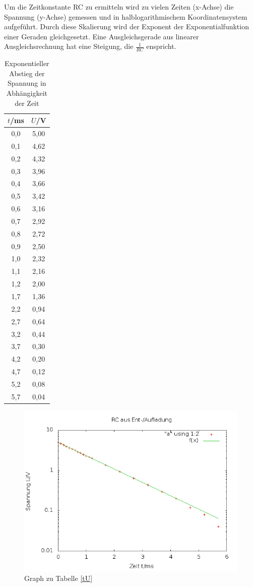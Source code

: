 Um die Zeitkonstante RC zu ermitteln wird zu vielen Zeiten (x-Achse) die Spannung (y-Achse) gemessen und in halblogarithmischem Koordinatensystem
aufgeführt. Durch diese Skalierung wird der Exponent der Exponentialfunktion einer Geraden gleichgesetzt. Eine Ausgleichsgerade aus linearer 
Ausgleichsrechnung hat eine Steigung, die $\frac{1}{RC}$ enspricht. 

\renewcommand{\arraystretch}{0.8}
\begin{table}[h!]
\begin{tabular}{c|c}
$t$/ms & $U$/V\\
\hline
0,0 &	5,00\\
0,1 &	4,62\\
0,2 &	4,32\\
0,3 &	3,96\\
0,4 &	3,66\\
0,5 &	3,42\\
0,6 &	3,16\\
0,7 &	2,92\\
0,8 &	2,72\\
0,9 &	2,50\\
1,0 &	2,32\\
1,1 &	2,16\\
1,2 &	2,00\\
1,7 &	1,36\\
2,2 &	0,94\\
2,7 &	0,64\\
3,2 &	0,44\\
3,7 &	0,30\\
4,2 &	0,20\\
4,7 &	0,12\\
5,2 &	0,08\\
5,7 &	0,04 
\end{tabular}
\label{tU}
\caption{Exponentieller Abstieg der Spannung in Abhängigkeit der Zeit}
\end{table}
\renewcommand{\arraystretch}{1}

\begin{figure}[H]
\includegraphics [width=1\textwidth] {_pics/RC1.png}
\caption{Graph zu Tabelle \eqref{tU}}
\end{figure}
\newpage

